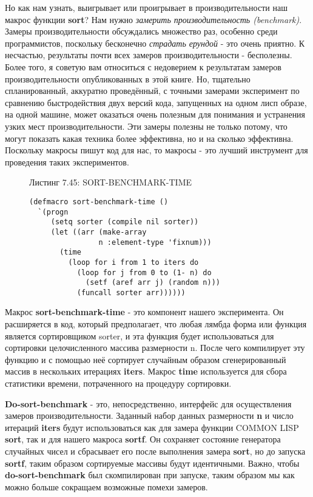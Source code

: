 Но как нам узнать, выигрывает или проигрывает в производительности наш макрос функции \textbf{sort}? Нам нужно \emph{замерить производительность (benchmark)}. Замеры производительности обсуждались множество раз, особенно среди программистов, поскольку бесконечно \emph{страдать ерундой} - это очень приятно. К несчастью, результаты почти всех замеров производительности - бесполезны. Более того, я советую вам относиться с недоверием к результатам замеров производительности опубликованных в этой книге. Но, тщательно спланированный, аккуратно проведённый, с точными замерами эксперимент по сравнению быстродействия двух версий кода, запущенных на одном лисп образе, на одной машине, может оказаться очень полезным для понимания и устранения узких мест производительности. Эти замеры полезны не только потому, что могут показать какая техника более эффективна, но и на сколько эффективна. Поскольку макросы пишут код для нас, то макросы - это лучший инструмент для проведения таких экспериментов.

\begin{figure}Листинг 7.45: SORT-BENCHMARK-TIME\label{listing_7.45}
\listbegin
\begin{verbatim}
(defmacro sort-benchmark-time ()
  `(progn
     (setq sorter (compile nil sorter))
     (let ((arr (make-array
                n :element-type 'fixnum)))
       (time
         (loop for i from 1 to iters do
           (loop for j from 0 to (1- n) do
             (setf (aref arr j) (random n)))
           (funcall sorter arr))))))
\end{verbatim}
\listend
\end{figure}

Макрос \textbf{sort-benchmark-time} - это компонент нашего эксперимента. Он расширяется в код, который предполагает, что любая лямбда форма или функция является сортировщиком sorter, и эта функция будет использоваться для сортировки целочисленного массива размерности n. После чего компилирует эту функцию и с помощью неё сортирует случайным образом сгенерированный массив в нескольких итерациях \textbf{iters}. Макрос \textbf{time} используется для сбора статистики времени, потраченного на процедуру сортировки.

\textbf{Do-sort-benchmark} - это, непосредственно, интерфейс для осуществления замеров производительности. Заданный набор данных размерности \textbf{n} и число итераций \textbf{iters} будут использоваться как для замера функции COMMON LISP \textbf{sort}, так и для нашего макроса \textbf{sortf}. Он сохраняет состояние генератора случайных чисел и сбрасывает его после выполнения замера \textbf{sort}, но до запуска \textbf{sortf}, таким образом сортируемые массивы будут идентичными. Важно, чтобы \textbf{do-sort-benchmark} был скомпилирован при запуске, таким образом мы как можно больше сокращаем возможные помехи замеров.

